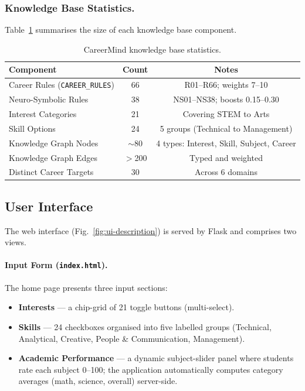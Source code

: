 \documentclass[runningheads]{llncs}
\begin{document}
\subsubsection{Knowledge Base Statistics.}
\label{sec:kb}
Table~\ref{tab:kb} summarises the size of each knowledge base component.

\begin{table}[htbp]
\centering
\caption{CareerMind knowledge base statistics.}
\label{tab:kb}
\begin{tabular}{@{}lcc@{}}
\toprule
Component & Count & Notes \\
\midrule
Career Rules (\texttt{CAREER\_RULES}) & 66 & R01--R66; weights 7--10 \\
Neuro-Symbolic Rules & 38 & NS01--NS38; boosts 0.15--0.30 \\
Interest Categories & 21 & Covering STEM to Arts \\
Skill Options & 24 & 5 groups (Technical to Management) \\
Knowledge Graph Nodes & $\sim$80 & 4 types: Interest, Skill, Subject, Career \\
Knowledge Graph Edges & $>$200 & Typed and weighted \\
Distinct Career Targets & 30 & Across 6 domains \\
\bottomrule
\end{tabular}
\end{table}

\subsection{User Interface}
\label{sec:ui}

The web interface (Fig.~\ref{fig:ui-description}) is served by Flask and
comprises two views.

\paragraph{Input Form (\texttt{index.html}).}
The home page presents three input sections:
\begin{itemize}
  \item \textbf{Interests} — a chip-grid of 21 toggle buttons (multi-select).
  \item \textbf{Skills} — 24 checkboxes organised into five labelled groups
        (Technical, Analytical, Creative, People \& Communication, Management).
  \item \textbf{Academic Performance} — a dynamic subject-slider panel where
        students rate each subject 0--100; the application automatically
        computes category averages (math, science, overall) server-side.
\end{itemize}
\end{document}
